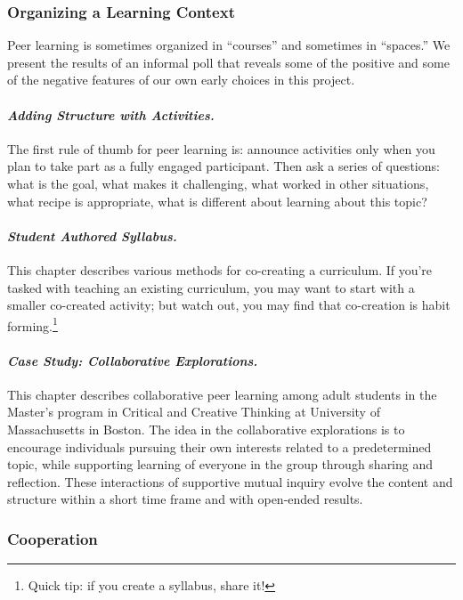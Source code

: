 \subsubsection{Organizing a Learning Context}

\noindent Peer learning is sometimes organized in ``courses'' and
sometimes in ``spaces.''  We present the results of an informal poll
that reveals some of the positive and some of the negative features of
our own early choices in this project.

\paragraph{\emph{Adding Structure with Activities.}} The first rule of thumb for
peer learning is: announce activities only when you plan to take part
as a fully engaged participant. Then ask a series of questions: what
is the goal, what makes it challenging, what worked in other
situations, what recipe is appropriate, what is different about
learning about this topic?

\paragraph{\emph{Student Authored Syllabus.}}  This chapter
describes various methods for co-creating a curriculum.  If you're
tasked with teaching an existing curriculum, you may want to start
with a smaller co-created activity; but watch out, you may find that
co-creation is habit forming.\footnote{Quick tip: if you create a
syllabus, share it!}

\paragraph{\emph{Case Study: Collaborative Explorations.}} This
chapter describes collaborative peer learning among adult students in
the Master's program in Critical and Creative Thinking at University
of Massachusetts in Boston.  The idea in the collaborative
explorations is to encourage individuals pursuing their own interests
related to a predetermined topic, while supporting learning of
everyone in the group through sharing and reflection.  These
interactions of supportive mutual inquiry evolve the content and
structure within a short time frame and with open-ended results.

\subsubsection{Cooperation}


